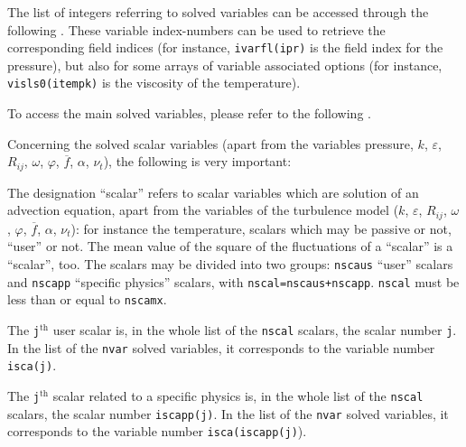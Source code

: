 {{{{The list of integers referring to solved variables can be accessed through
the following .
These variable index-numbers can be used to retrieve the corresponding field indices
(for instance, \texttt{ivarfl(ipr)} is the field index for the pressure),
but also for some arrays of variable associated options (for instance,
\texttt{visls0(itempk)} is the viscosity of the temperature).

To access the main solved variables, please refer to the following
.

\bigskip

Concerning the solved scalar variables (apart from the variables
pressure, $k$, $\varepsilon$, $R_{ij}$, $\omega$, $\varphi$,
$\overline{f}$, $\alpha$, $\nu_t$), the following is very important:
\begin{list}{-}{}
\item The designation ``scalar'' refers to scalar variables which are
      solution of an advection equation, apart from the variables of the
      turbulence model  ($k$, $\varepsilon$, $R_{ij}$, $\omega$,
      $\varphi$, $\overline{f}$, $\alpha$, $\nu_t$): for instance the
      temperature, scalars which may be passive or not, ``user'' or not.
      The mean value of the square of the fluctuations of a ``scalar'' is a
      ``scalar'', too. The scalars may be divided into two groups:
      \texttt{nscaus} ``user'' scalars and \texttt{nscapp}
      ``specific physics'' scalars, with \texttt{nscal=nscaus+nscapp}.
      \texttt{nscal} must be less than or equal to \texttt{nscamx}.
\item The \texttt{j}$^{\text{th}}$ user scalar is, in
      the whole list of the \texttt{nscal} scalars, the scalar number
      \texttt{j}. In the list of the \texttt{nvar} solved variables, it
      corresponds to the variable number \texttt{isca(j)}.
\item The \texttt{j}$^{\text{th}}$ scalar related to a specific physics is, in
      the whole list of the \texttt{nscal} scalars, the scalar number
      \texttt{iscapp(j)}. In the list of the \texttt{nvar} solved variables, it
      corresponds to the variable number
      \texttt{isca(iscapp(j)}).


\end{list}}}}}
